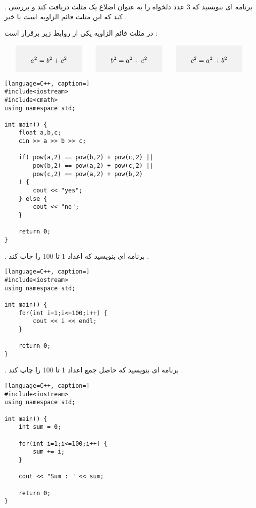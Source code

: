 \documentclass[12pt]{article}
\begin{document}
\newpage

 . برنامه ای بنویسید که 3 عدد دلخواه را به عنوان اضلاع یک مثلث دریافت کند و بررسی کند که این مثلث قائم الزاویه است یا خیر . 

در مثلث قائم الزاویه یکی از روابط زیر برقرار است :


\begin{align*}
\colorbox{gray!10}{\parbox{90pt}{
$$a^{2} = b^{2} + c^{2}$$
}}
\qquad
\colorbox{gray!10}{\parbox{90pt}{
$$b^{2} = a^{2} + c^{2}$$
}}
\qquad
\colorbox{gray!10}{\parbox{90pt}{
$$c^{2} = a^{2} + b^{2} $$
}}
\end{align*}






\begin{latin}
\begin{lstlisting}[language=C++, caption=]
#include<iostream>
#include<cmath>
using namespace std;

int main() {
	float a,b,c;
	cin >> a >> b >> c;
	
	if( pow(a,2) == pow(b,2) + pow(c,2) || 
		pow(b,2) == pow(a,2) + pow(c,2) || 
		pow(c,2) == pow(a,2) + pow(b,2) 
	) {
		cout << "yes";
	} else {
		cout << "no";
	}
	
	return 0;
}
\end{lstlisting}
\end{latin}






\newpage

 . برنامه ای بنویسید که اعداد 1 تا 100 را چاپ کند .



\begin{latin}
\begin{lstlisting}[language=C++, caption=]
#include<iostream>
using namespace std;

int main() {
	for(int i=1;i<=100;i++) {
		cout << i << endl;
	}
	
	return 0;
}
\end{lstlisting}
\end{latin}




 . برنامه ای بنویسید که حاصل جمع اعداد 1 تا 100 را چاپ کند .





\begin{latin}
\begin{lstlisting}[language=C++, caption=]
#include<iostream>
using namespace std;

int main() {
	int sum = 0;
	
	for(int i=1;i<=100;i++) {
		sum += i;
	}
	
	cout << "Sum : " << sum;
	
	return 0;
}
\end{lstlisting}
\end{latin}
\end{document}
